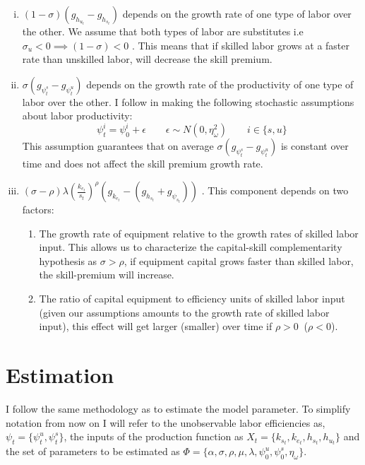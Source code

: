 \documentclass[12pt]{article}
\begin{document}
\begin{enumerate}[(i)]
 \item $(1-\sigma)(g_{h_{u_t}}-g_{h_{s_t}})$ depends on the growth rate of one type of labor over the other. We assume that both types of labor are substitutes i.e $\sigma_u < 0 \implies (1-\sigma) < 0$ . This means that if skilled labor grows at a faster rate than unskilled labor, will decrease the skill premium.
 \item $\sigma\left(g_{\psi^s_t}-g_{\psi^u_t}\right)$ depends on the growth rate of the productivity of one type of labor over the other. I follow \citep{krusell2000capital} in making the following stochastic assumptions about labor productivity:
 \begin{equation}\label{eq:stochastic_labor_productivity}
 \psi^i_t = \psi^i_0 + \epsilon \qquad \epsilon \sim N(0, \eta_\omega^2) \qquad i\in\{s,u\}
 \end{equation}
 This assumption guarantees that on average $\sigma (g_{\psi^s_t}-g_{\psi^u_t} )$ is constant over time and does not affect the skill premium growth rate. 
 \item $(\sigma-\rho) \lambda\left(\frac{k_{e_t}}{s_{t}}\right)^{\rho}\left(g_{k_{e_t}}-(g_{h_{s_t}}+g_{\psi_{s_t}})\right)$ . This component depends on two factors:
 \begin{enumerate}
 \item The growth rate of equipment relative to the growth rates of skilled labor input. This allows us to characterize the capital-skill complementarity hypothesis as $\sigma > \rho$, if equipment capital grows faster than skilled labor, the skill-premium will increase.
 \item The ratio of capital equipment to efficiency units of skilled labor input (given our assumptions amounts to the growth rate of skilled labor input), this effect will get larger (smaller) over time if $\rho > 0\:$ ($\rho < 0$). 
 \end{enumerate}
\end{enumerate}

\section{Estimation}
I follow the same methodology as \citep{krusell2000capital} to estimate the model parameter. To simplify notation from now on I will refer to the unobservable labor efficiencies as, $\psi_t = \{\psi^u_t, \psi^s_t\}$, the inputs of the production function as $X_t = \{ k_{s_t} , k_{e_t}, h_{s_t}, h_{u_t}\}$ and the set of parameters to be estimated as $\Phi = \{\alpha, \sigma, \rho, \mu, \lambda, \psi^u_0, \psi^s_0, \eta_\omega \}$. 
\end{document}
